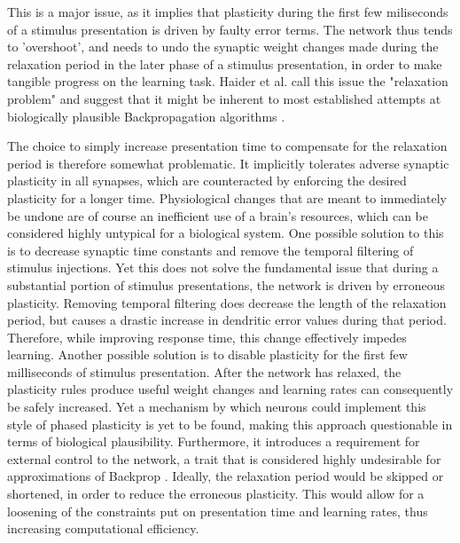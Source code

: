 This is a major issue, as it implies that plasticity during the first few miliseconds of a stimulus presentation is
driven by faulty error terms. The network thus tends to 'overshoot', and needs to undo the synaptic weight changes made
during the relaxation period in the later phase of a stimulus presentation, in order to make tangible progress on the
learning task. Haider et al. call this issue the "relaxation problem" and suggest that it might be inherent to most
established attempts at biologically plausible Backpropagation algorithms
\citep{Whittington2017,guerguiev2017towards,sacramento2018dendritic,millidge2020activation}.



The choice to simply increase presentation time to compensate for the relaxation period is therefore somewhat
problematic. It implicitly tolerates adverse synaptic plasticity in all synapses, which are counteracted by enforcing
the desired plasticity for a longer time. Physiological changes that are meant to immediately be undone are of course an
inefficient use of a brain's resources, which can be considered highly untypical for a biological system. One possible
solution to this is to decrease synaptic time constants and remove the temporal filtering of stimulus injections. Yet
this does not solve the fundamental issue that during a substantial portion of stimulus presentations, the network is
driven by erroneous plasticity. Removing temporal filtering does decrease the length of the relaxation period, but
causes a drastic increase in dendritic error values during that period. Therefore, while improving response time, this
change effectively impedes learning. Another possible solution is to disable plasticity for the first few milliseconds
of stimulus presentation. After the network has relaxed, the plasticity rules produce useful weight changes and learning
rates can consequently be safely increased. Yet a mechanism by which neurons could implement this style of phased
plasticity is yet to be found, making this approach questionable in terms of biological plausibility. Furthermore, it
introduces a requirement for external control to the network, a trait that is considered highly undesirable for
approximations of Backprop \citep{whittington2019theories}. Ideally, the relaxation period would be skipped or
shortened, in order to reduce the erroneous plasticity. This would allow for a loosening of the constraints put on
presentation time and learning rates, thus increasing computational efficiency. \newline



